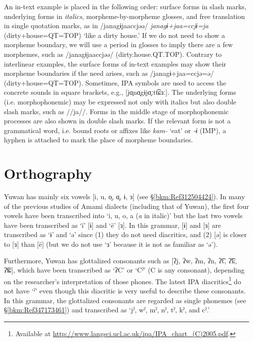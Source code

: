 An in-text example is placed in the following order: surface forms in slash marks, underlying forms in \textit{italics}, morpheme-by-morpheme glosses, and free translation in single quotation marks, as in /janagɨjaaccjəə/ \textit{janagɨ+jaa=ccjɨ=ja} (dirty+house=QT=TOP) ‘like a dirty house.’ If we do not need to show a morpheme boundary, we will use a period in glosses to imply there are a few morphemes, such as /janagɨjaaccjəə/ (dirty.house.QT.TOP). Contrary to interlinear examples, the surface forms of in-text examples may show their morpheme boundaries if the need arises, such as /janagɨ+jaa=ccjə=ə/ (dirty+house=QT=TOP). Sometimes, IPA symbols are used to access the concrete sounds in square brackets, e.g., [jɑ̟nɑ̟gɨjɑ̟ːtt͡ɕɜː]. The underlying forms (i.e. morphophonemic) may be expressed not only with italics but also double slash marks, such as //ja//. Forms in the middle stage of morphophonemic processes are also shown in double slash marks. If the relevant form is not a grammatical word, i.e. bound roots or affixes like \textit{kam-} ‘eat’ or \textit{{}-ɨ} (IMP), a hyphen is attached to mark the place of morpheme boundaries.

\section*{Orthography}

Yuwan has mainly six vowels [i, u, o̞, ɑ̟, ɨ, ɜ] (see §\ref{bkm:Ref312504424}). In many of the previous studies of Amami dialects (including that of Yuwan), the first four vowels have been transcribed into ‘i, u, o, a (\textit{a} in italic)’ but the last two vowels have been transcribed as ‘ï’ [ɨ] and ‘ë’ [ɜ]. In this grammar, [ɨ] and [ɜ] are transcribed as ‘ɨ’ and ‘ə’ since (1) they do not need diacritics, and (2) [ə] is closer to [ɜ] than [ë] (but we do not use ‘ɜ’ because it is not as familiar as ‘ə’).

Furthermore, Yuwan has glottalized consonants such as [ʔj, ʔw, ʔm, ʔn, ʔ͡t, ʔ͡k, ʔ͡ʨ], which have been transcribed as ‘ʔC’ or ‘Cˀ’ (C is any consonant), depending on the researcher’s interpretation of those phones. The latest IPA diacritics\footnote{Available at \url{http://www.langsci.ucl.ac.uk/ipa/IPA\_chart\_(C)2005.pdf}.} do not have ‘ˀ’ even though this diacritic is very useful to describe these consonants. In this grammar, the glottalized consonants are regarded as single phonemes (see §\ref{bkm:Ref347173461}) and transcribed as ‘jˀ, wˀ, mˀ, nˀ, tˀ, kˀ, and cˀ.’

